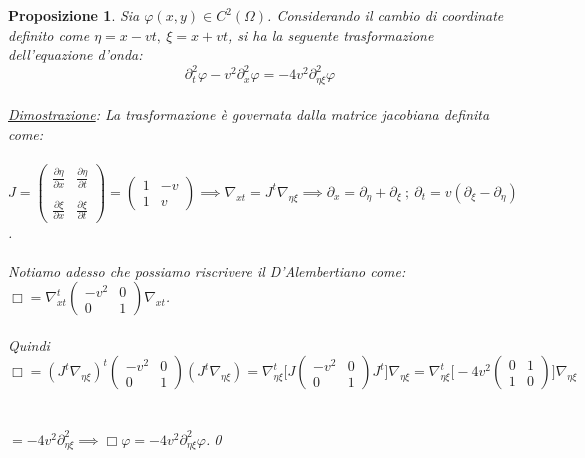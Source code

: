 \documentclass[a4paper,12pt]{report}
\newtheorem{proposizione}{Proposizione}[chapter]
\newcommand{\pd}[2]{\frac{\partial #1}{\partial #2}}
\begin{document}
\newpage

\begin{proposizione}
    Sia $\varphi(x,y)\in C^2(\Omega)$. Considerando il cambio di coordinate definito come $\eta=x-vt, \ \xi=x+vt$, si ha la seguente trasformazione dell'equazione d'onda: 
    \[\partial_t^2\varphi-v^2\partial_x^2\varphi=-4v^2\partial_{\eta\xi}^2\varphi\]
    \\\underline{Dimostrazione}: La trasformazione è governata dalla matrice jacobiana definita come:
    \\ 
    \\$J=\begin{pmatrix}
        \pd{\eta}{x}&\pd{\eta}{t}
        \\
    \\  \pd{\xi}{x}&\pd{\xi}{t}
    \end{pmatrix}=\begin{pmatrix}
        1&-v
        \\1&v
    \end{pmatrix}\implies \nabla_{xt}=J^t\nabla_{\eta\xi}\implies \partial_x=\partial_\eta+\partial_\xi \ ; \ \partial_t=v(\partial_\xi-\partial_\eta)$.
    \\ 
    \\ Notiamo adesso che possiamo riscrivere il D'Alembertiano come: $\Box=\nabla_{xt}^t\begin{pmatrix}
        -v^2&0
        \\0&1
    \end{pmatrix}\nabla_{xt}$.
    \\
    \\ Quindi $\Box=(J^t\nabla _{\eta\xi})^t\begin{pmatrix}
        -v^2&0
        \\0&1
    \end{pmatrix}(J^t\nabla _{\eta\xi})=\nabla_{\eta\xi}^t\bigg[J\begin{pmatrix}
        -v^2&0
        \\0&1
    \end{pmatrix}J^t\bigg]\nabla_{\eta\xi}=\nabla_{\eta\xi}^t\bigg[-4v^2\begin{pmatrix}
        0&1
        \\1&0
    \end{pmatrix}\bigg]\nabla_{\eta\xi}$
    \\
    \\
    \\$=-4v^2\partial_{\eta\xi}^2\implies\Box\varphi=-4v^2\partial_{\eta\xi}^2\varphi$.\qed 
\end{proposizione}
\end{document}
